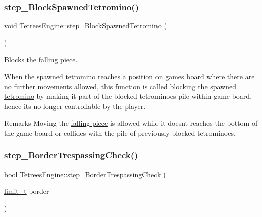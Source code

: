 \subsubsection{\texorpdfstring{step\+\_\+\+Block\+Spawned\+Tetromino()}{step\_BlockSpawnedTetromino()}}
{\footnotesize\ttfamily void Tetrees\+Engine\+::step\+\_\+\+Block\+Spawned\+Tetromino (\begin{DoxyParamCaption}{ }\end{DoxyParamCaption})\hspace{0.3cm}{\ttfamily [private]}}



Blocks the falling piece. 

When the \hyperlink{classTetreesEngine_a26435ee2f02d9ba70d9e359745114f6e}{spawned tetromino} reaches a position on game\textquotesingle{}s board where there are no further \hyperlink{TetreesDefs_8hpp_a4d5a793092a473f85b4c1f7faf62afed}{movements} allowed, this function is called blocking the \hyperlink{classTetreesEngine_a26435ee2f02d9ba70d9e359745114f6e}{spawned tetromino} by making it part of the blocked tetrominoes pile within game board, hence it\textquotesingle{}s no longer controllable by the player. \begin{DoxyRemark}{Remarks}
Moving the \hyperlink{classTetreesEngine_a26435ee2f02d9ba70d9e359745114f6e}{falling piece} is allowed while it doesn\textquotesingle{}t reaches the bottom of the game board or collides with the pile of previously blocked tetrominoes. 
\end{DoxyRemark}
\mbox{\label{classTetreesEngine_aa593f5f688e984a2cdbbf83b162d00a2}} 
\subsubsection{\texorpdfstring{step\+\_\+\+Border\+Trespassing\+Check()}{step\_BorderTrespassingCheck()}}
{\footnotesize\ttfamily bool Tetrees\+Engine\+::step\+\_\+\+Border\+Trespassing\+Check (\begin{DoxyParamCaption}\item[{\hyperlink{TetreesDefs_8hpp_a5dbb1ebfe8a9b95707ac161d3549ed8a}{limit\+\_\+t}}]{border }\end{DoxyParamCaption})\hspace{0.3cm}{\ttfamily [private]}}



